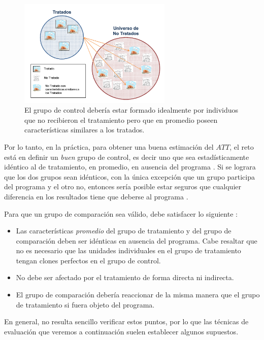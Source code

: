 \documentclass[../../main.tex]{subfiles}
\begin{document}
\begin{figure}[h!]
    \centering
    \includegraphics[width=0.65\textwidth]{figs/grupo-de-control.png}
    \caption{El grupo de control debería estar formado idealmente por individuos que no
    recibieron el tratamiento pero que en promedio poseen características similares a
    los tratados.}
    \label{fig:control-group}
\end{figure}

Por lo tanto, en la práctica, para obtener una buena estimación del \(ATT\), el reto está
en definir un \textit{buen} grupo de control, es decir uno que sea estadísticamente
idéntico al de tratamiento, en promedio, en ausencia del programa \cite{gertler-2016}. Si
se lograra que los dos grupos sean idénticos, con la única excepción que un grupo
participa del programa y el otro no, entonces sería posible estar seguros que cualquier
diferencia en los resultados tiene que deberse al programa \cite{gertler-2016}.

Para que un grupo de comparación sea válido, debe satisfacer lo siguiente \cite{gertler-2016}:
\begin{itemize}
    \item Las características \textit{promedio} del grupo de tratamiento y del grupo de
    comparación deben ser idénticas en ausencia del programa. Cabe resaltar que no es
    necesario que las unidades individuales en el grupo de tratamiento tengan clones
    perfectos en el grupo de control.
    \item No debe ser afectado por el tratamiento de forma directa ni indirecta.
    \item El grupo de comparación debería reaccionar de la misma manera que el grupo de
    tratamiento si fuera objeto del programa.
\end{itemize}
En general, no resulta sencillo verificar estos puntos, por lo que las técnicas de
evaluación que veremos a continuación suelen establecer algunos supuestos.
\end{document}
